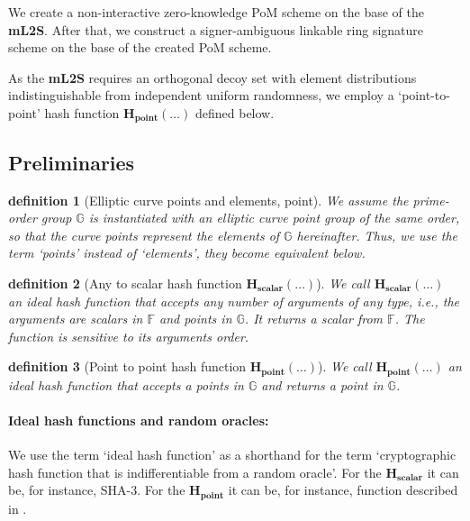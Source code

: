 \documentclass{mathcryptology} %
\newcommand{\Hpoint}{\textbf{H}_{\textbf{point}}}
\newcommand{\Hscalar}{\textbf{H}_{\textbf{scalar}}}
\theoremstyle{title}
\newtheorem*{titledefinition}{definition}
\theoremstyle{titleof}
\begin{document}
    We create a non-interactive zero-knowledge PoM scheme on the base of the \textbf{mL2S}. After that, we construct a signer-ambiguous linkable ring signature scheme on the base of the created PoM scheme. \

    As the \textbf{mL2S} requires an orthogonal decoy set with element distributions indistinguishable from independent uniform randomness, we employ a `point-to-point' hash function $\Hpoint (\dots)$ defined below.


\subsection{Preliminaries}

    \begin{titledefinition}[Elliptic curve points and elements, point]
        We assume the prime-order group $\mathds{G}$ is instantiated with an elliptic curve point group of the same order, so that the curve points represent the elements of $\mathds{G}$ hereinafter. Thus, we use the term `points' instead of `elements', they become equivalent below.
    \end{titledefinition}

    \begin{titledefinition}[Any to scalar hash function $\Hscalar(\dots)$]
        We call $\Hscalar(\dots)$ an ideal hash function that accepts any number of arguments of any type, i.e., the arguments are scalars in $\mathds{F}$ and points in $\mathds{G}$. It returns a scalar from $\mathds{F}$. The function is sensitive to its arguments order.
    \end{titledefinition}

    \begin{titledefinition}[Point to point hash function $\Hpoint(\dots)$]
        We call $\Hpoint(\dots)$ an ideal hash function that accepts a points in $\mathds{G}$ and returns a point in $\mathds{G}$.
    \end{titledefinition}

\paragraph*{Ideal hash functions and random oracles:}
    We use the term `ideal hash function' as a shorthand for the term `cryptographic hash function that is indifferentiable from a random oracle'. For the $\Hscalar$ it can be, for instance, SHA-3. For the $\Hpoint$ it can be, for instance, function described in \cite{7}.
\end{document}
